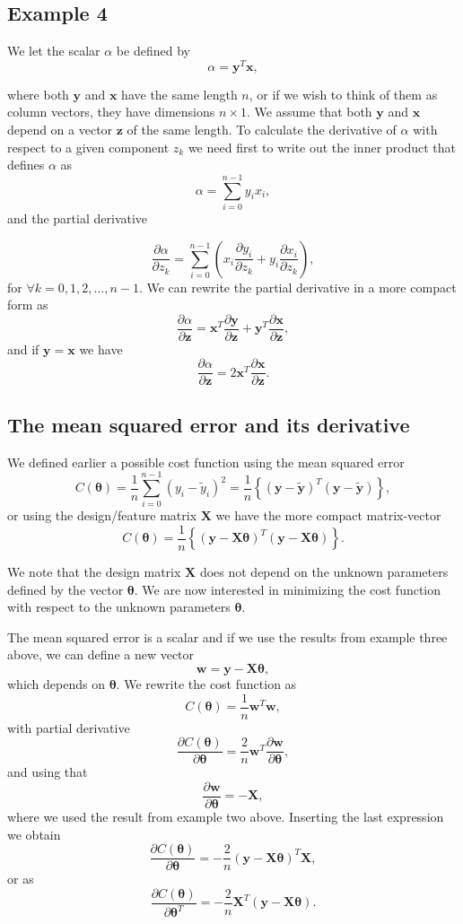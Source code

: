 \documentclass[%
oneside,                 %
final,                   %
10pt]{article}
\begin{document}
\subsection{Example 4}

We let the scalar $\alpha$ be defined by
\[
\alpha = \bm{y}^T\bm{x},
\]

where both $\bm{y}$ and $\bm{x}$ have the same length $n$, or if we
wish to think of them as column vectors, they have dimensions $n\times
1$. We assume that both $\bm{y}$ and $\bm{x}$ depend on a vector
$\bm{z}$ of the same length. To calculate the derivative of $\alpha$
with respect to a given component $z_k$ we need first to write out the
inner product that defines $\alpha$ as
\[
\alpha  = \sum_{i=0}^{n-1}y_ix_i,
\]
and the partial derivative

\[
\frac{\partial \alpha}{\partial z_k}  = \sum_{i=0}^{n-1}\left(x_i\frac{\partial y_i}{\partial z_k}+y_i\frac{\partial x_i}{\partial z_k}\right),
\]
for $\forall k =0,1,2,\dots,n-1$. We can rewrite the partial derivative in a more compact form as
\[
\frac{\partial \alpha}{\partial \bm{z}}  = \bm{x}^T\frac{\partial \bm{y}}{\partial \bm{z}}+\bm{y}^T\frac{\partial \bm{x}}{\partial \bm{z}},
\]
and if $\bm{y}=\bm{x}$ we have
\[
\frac{\partial \alpha}{\partial \bm{z}}  = 2\bm{x}^T\frac{\partial \bm{x}}{\partial \bm{z}}.
\]

\subsection{The mean squared error and its derivative}

We defined earlier a possible cost function using the mean squared error
\[
C(\bm{\theta})=\frac{1}{n}\sum_{i=0}^{n-1}\left(y_i-\tilde{y}_i\right)^2=\frac{1}{n}\left\{\left(\bm{y}-\bm{\tilde{y}}\right)^T\left(\bm{y}-\bm{\tilde{y}}\right)\right\},
\]
or using the design/feature matrix $\bm{X}$ we have the more compact matrix-vector
\[
C(\bm{\theta})=\frac{1}{n}\left\{\left(\bm{y}-\bm{X}\bm{\theta}\right)^T\left(\bm{y}-\bm{X}\bm{\theta}\right)\right\}.
\]

We note that the design matrix $\bm{X}$ does not depend on the unknown parameters defined by the vector $\bm{\theta}$.
We are now interested in minimizing the cost function with respect to the unknown parameters $\bm{\theta}$.

The mean squared error is a scalar and if we use the results from example three above, we can define a new vector
\[
\bm{w}=\bm{y}-\bm{X}\bm{\theta},
\]
which depends on $\bm{\theta}$. We rewrite the cost function as
\[
C(\bm{\theta})=\frac{1}{n}\bm{w}^T\bm{w},
\]
with partial derivative
\[
\frac{\partial C(\bm{\theta})}{\partial \bm{\theta}}=\frac{2}{n}\bm{w}^T\frac{\partial \bm{w}}{\partial \bm{\theta}},
\]
and using that
\[
\frac{\partial \bm{w}}{\partial \bm{\theta}}=-\bm{X},
\]
where we used the result from example two above. Inserting the last expression we obtain
\[
\frac{\partial C(\bm{\theta})}{\partial \bm{\theta}}=-\frac{2}{n}\left(\bm{y}-\bm{X}\bm{\theta}\right)^T\bm{X},
\]
or as
\[
\frac{\partial C(\bm{\theta})}{\partial \bm{\theta}^T}=-\frac{2}{n}\bm{X}^T\left(\bm{y}-\bm{X}\bm{\theta}\right).
\]
\end{document}
